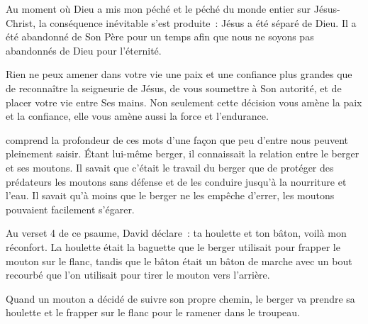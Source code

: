 
Au moment où Dieu a mis mon péché \ocadr{}et le péché du monde entier\fcadr{}
 sur Jésus-Christ, la conséquence inévitable s'est produite~:
 Jésus a été séparé de Dieu. Il a été abandonné de Son Père
 pour un temps afin que nous ne soyons pas abandonnés de Dieu pour l'éternité.

Rien ne peux amener dans votre vie une paix et une confiance plus grandes
 que de reconnaître la seigneurie 
 de Jésus, de vous soumettre à Son autorité,
 et de placer votre vie entre Ses mains.
 Non seulement cette décision vous amène la paix et la confiance,
 elle vous amène aussi la force et l'endurance.

\dvrule







 comprend la profondeur de ces mots
 d'une façon que peu d'entre nous peuvent pleinement saisir.
 Étant lui-même berger, il connaissait la relation entre le berger
 et ses moutons.
 Il savait que c'était le travail du berger que de protéger
 des prédateurs les moutons sans défense et de les conduire
 jusqu'à la nourriture et l'eau.
 Il savait qu'à moins que le berger ne les empêche d'errer,
 les moutons pouvaient facilement s'égarer.

Au verset 4 de ce psaume, David déclare~:
 \og ta houlette et ton bâton, voilà mon réconfort. \fg{}
 La houlette était la baguette que le berger utilisait
 pour frapper le mouton sur le flanc, tandis que le bâton
 était un bâton de marche avec un bout recourbé
 que l'on utilisait pour tirer le mouton vers l'arrière.


Quand un mouton a décidé de suivre son propre chemin,
 le berger va prendre sa houlette et le frapper
 sur le flanc pour le ramener dans le troupeau.

